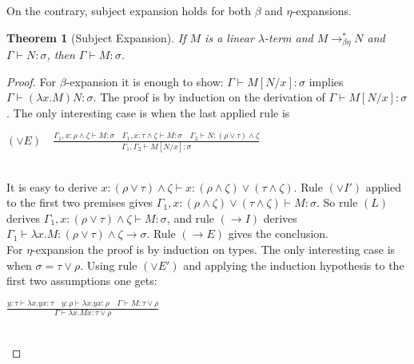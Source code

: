 \documentclass[UKenglish]{eptcs}
\newtheorem{theorem}[fact]{Theorem}
\newcommand{\dup}{\! : \!}
\newcommand{\tA}{\sigma}       \newcommand{\tB}{\tau}
\newcommand{\tC}{\rho}
\newcommand{\tD}{\zeta}
\newcommand{\B}{\Gamma}
\newcommand{\db}{\displaystyle}
\newcommand{\labelx}[1]{\label{#1}}
\newcommand{\myformulaE}[1]{\\[4pt]\centerline{#1}\\[4pt]}
\begin{document}
\smallskip

On the contrary, subject expansion holds for both $\beta$ and $\eta$-expansions.
\begin{theorem}[Subject Expansion] \labelx{setheorem}
If  $M$ is a linear $\lambda$-term and $M\longrightarrow_{\beta\eta}^*N$ and $\B \vdash
N\dup\tA$, then $\B \vdash M\dup\tA$.
\end{theorem}
\begin{proof}
For $\beta$-expansion it is enough to show: $\B \vdash M[N/x]\dup\tA$ implies  $\B \vdash (\lambda x.M)N\dup\tA$. The proof is by induction on the derivation of $\B \vdash M[N/x]\dup\tA$.
The only interesting case is when the last applied rule is
\myformulaE{$(\vee E) \quad \db \frac{\B_{1}, x\dup\tC\wedge\tD \vdash M\dup\sigma\quad \B_{1}, x\dup\tB\wedge\tD \vdash M\dup\sigma\quad \B_{2} \vdash N\dup(\tC\vee\tB)\wedge\tD}{\B_{1},\B_{2} \vdash M[N/x]\dup\sigma}$}
It is easy to derive $x\dup(\tC\vee\tB)\wedge\tD \vdash x\dup(\tC\wedge\tD)\vee(\tB\wedge\tD)$. Rule $(\vee I')$ applied to the first two premises gives $\B_{1}, x\dup(\tC\wedge\tD)\vee(\tB\wedge\tD)\vdash M\dup\sigma$. So rule $(L)$ derives $\B_{1}, x\dup(\tC\vee\tB)\wedge\tD\vdash M\dup\sigma$, and rule $(\to I)$ derives $\B_{1}\vdash \lambda x. M\dup (\tC\vee\tB)\wedge\tD\to\sigma$. Rule $(\to E)$ gives the conclusion.\\
For $\eta$-expansion the proof is by induction on types. The only interesting case is when $\tA = \tB \vee \tC$. Using rule $(\vee E')$ and applying the induction hypothesis to the first two assumptions one gets:
\myformulaE{     $\db \frac{ y\dup\tB \vdash \lambda x . y x \dup\tB\quad  y\dup\tC \vdash \lambda x. y x \dup\tC\quad \B \vdash M\dup\tB\vee\tC}{\B \vdash \lambda x. M x\dup\tB \vee \tC}$
   }   \vspace{-10mm}
\end{proof}
\end{document}
